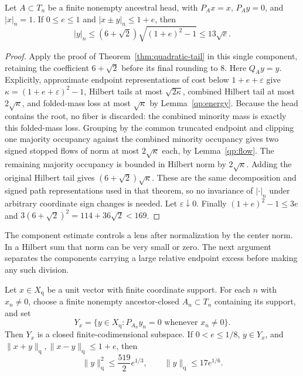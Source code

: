 \begin{lemma}\label{qp:rec:component}
Let $A\subset T_n$ be a finite nonempty ancestral head, with
$P_Ax=x$, $P_Ay=0$, and $|x|_n=1$.  If $0\le e\le1$ and
$|x\pm y|_n\le1+e$, then
\begin{equation}\label{qp:rec:component-bound}
 |y|_n\le(6+\sqrt2)\sqrt{(1+e)^2-1}\le13\sqrt e.
\end{equation}
\end{lemma}

\begin{proof}
Apply the proof of Theorem~\ref{thm:quadratic-tail} in this single
component, retaining the coefficient $6+\sqrt2$ before its final
rounding to $8$.  Here $Q_Ay=y$.  Explicitly, approximate endpoint
representations of cost below $1+e+\varepsilon$ give
$\kappa=(1+e+\varepsilon)^2-1$, Hilbert tails at most
$\sqrt{2\kappa}$, combined Hilbert tail at most $2\sqrt\kappa$,
and folded-mass loss at most $\sqrt\kappa$ by
Lemma~\ref{qp:energy}.  Because the head contains the root, no
fiber is discarded: the combined minority mass is exactly this
folded-mass loss.  Grouping by the common truncated endpoint and
clipping one majority occupancy against the combined minority
occupancy gives two signed stopped flows of norm at most
$2\sqrt\kappa$ each, by Lemma~\ref{qp:flow}.  The remaining
majority occupancy is bounded in Hilbert norm by
$2\sqrt\kappa$.  Adding the original Hilbert tail gives
$(6+\sqrt2)\sqrt\kappa$.  These are the same decomposition and
signed path representations used in that theorem, so no invariance
of $|\cdot|_n$ under arbitrary coordinate sign changes is needed.
Let $\varepsilon\downarrow0$.  Finally
$(1+e)^2-1\le3e$ and
$3(6+\sqrt2)^2=114+36\sqrt2<169$.
\end{proof}

The component estimate controls a lens after normalization by the center
norm.  In a Hilbert sum that norm can be very small or zero.  The next
argument separates the components carrying a large relative endpoint
excess before making any such division.

\begin{proposition}
\label{qp:rec:finite-center}
Let \(x\in X_{\mathrm q}\) be a unit vector with finite coordinate
support.  For each \(n\) with \(x_n\ne0\), choose a finite nonempty
ancestor-closed \(A_n\subset T_n\) containing its support, and set
\[
 Y_x=\{y\in X_{\mathrm q}:P_{A_n}y_n=0
                           \text{ whenever }x_n\ne0\}.
\]
Then \(Y_x\) is a closed finite-codimensional subspace.  If
\(0<e\le1/8\), \(y\in Y_x\), and
\(\|x+y\|_{\mathrm q},\|x-y\|_{\mathrm q}\le1+e\), then
\begin{equation}\label{qp:rec:outer-bound}
 \|y\|_{\mathrm q}^2\le\frac{519}{2}e^{1/3},
 \qquad \|y\|_{\mathrm q}\le17e^{1/6}.
\end{equation}
\end{proposition}

